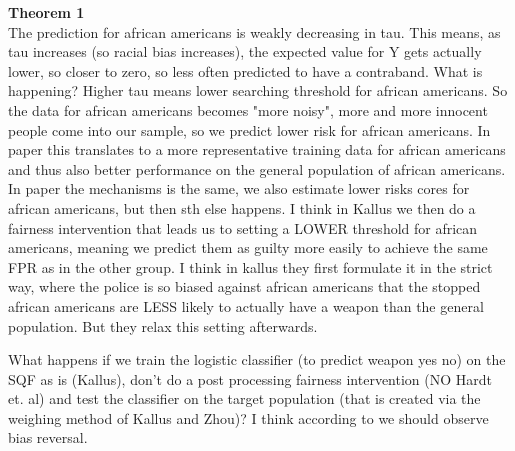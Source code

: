 \textbf{Theorem 1}\\
The prediction for african americans is weakly decreasing in tau. This means, as tau increases (so racial bias increases), the expected value for Y gets actually lower,
so closer to zero, so less often predicted to have a contraband. What is happening? Higher tau means lower searching threshold for african americans.
So the data for african americans becomes "more noisy", more and more innocent people come into our sample, so we predict lower risk for african americans. 
In \cite{RambachanBBOEFW} paper this translates to a more representative training data for african americans and thus also better performance on the general population of african americans.
In \cite{kallus} paper the mechanisms is the same, we also estimate lower risks cores for african americans, but then sth else happens.
I think in Kallus we then do a fairness intervention that leads us to setting a LOWER threshold for african americans, meaning we predict them as
guilty more easily to achieve the same FPR as in the other group. I think in kallus they first formulate it in the strict way, where the police is so biased against african americans
that the stopped african americans are LESS likely to actually have a weapon than the general population. But they relax this setting afterwards.


What happens if we train the logistic classifier (to predict weapon yes no) on the SQF as is (Kallus), don’t do a post processing fairness intervention (NO Hardt et. al)
and test the classifier on the target population (that is created via the weighing method of Kallus and Zhou)? I think according to \cite{RambachanBBOEFW} we should observe bias reversal.